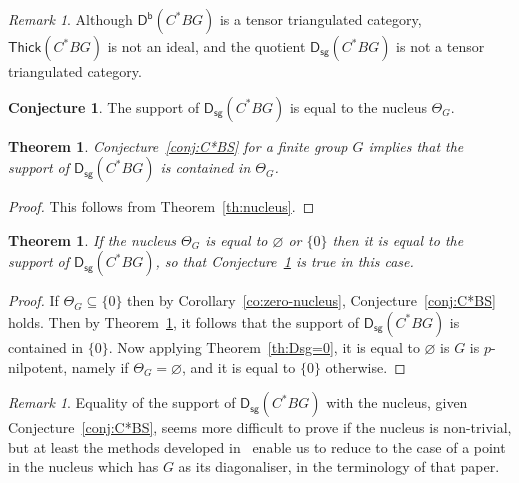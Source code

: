 \documentclass[12pt]{amsart}
\newcommand{\DD}{\mathsf{D}}%
\newcommand{\Db}{\DD^{\mathsf{b}}}%
\newcommand{\Dsg}{\DD_{\mathsf{sg}}}%
\newcommand{\Thick}{\mathsf{Thick}}
\numberwithin{equation}{section}
\theoremstyle{plain}
\newtheorem{theorem}[equation]{Theorem}
\theoremstyle{definition}
\newtheorem{conjecture}[equation]{Conjecture}
\theoremstyle{remark}
\newtheorem{remark}[equation]{Remark}
\begin{document}
\begin{remark}
  Although $\Db(C^*BG)$ is a tensor triangulated category,
  $\Thick(C^*BG)$ is not an ideal, and the quotient $\Dsg(C^*BG)$ is
  not a tensor triangulated category.
\end{remark}

\begin{conjecture}\label{conj:suppDsg}
  The support of $\Dsg(C^*BG)$ is equal to the nucleus $\Theta_G$.
\end{conjecture}

\begin{theorem}\label{th:C*BS=>suppDsg}
Conjecture~\ref{conj:C*BS} for a finite group $G$ implies that the support of $\Dsg(C^*BG)$
is contained in $\Theta_G$.
\end{theorem}
\begin{proof}
This follows from Theorem~\ref{th:nucleus}.
\end{proof}

\begin{theorem}\label{th:triv-nucleus}
If the nucleus $\Theta_G$ is equal to $\varnothing$ or $\{0\}$ then it
is equal to the support of $\Dsg(C^*BG)$, so that
Conjecture~\ref{conj:suppDsg} is true in this case.
\end{theorem}
\begin{proof}
If $\Theta_G\subseteq\{0\}$ then by Corollary~\ref{co:zero-nucleus},
Conjecture~\ref{conj:C*BS} holds. Then by
Theorem~\ref{th:C*BS=>suppDsg}, it follows that the support of
$\Dsg(C^*BG)$ is contained in $\{0\}$. Now applying
Theorem~\ref{th:Dsg=0}, it is equal to $\varnothing$ is $G$ is
$p$-nilpotent, namely if $\Theta_G=\varnothing$, and it is equal to
$\{0\}$ otherwise.
\end{proof}


  
\begin{remark}
  Equality of the support of $\Dsg(C^*BG)$ with the nucleus, given
  Conjecture~\ref{conj:C*BS}, seems more difficult to prove if the
  nucleus is non-trivial, but at
  least the methods developed in~\cite{Benson:1995a} enable us to
  reduce to the case of a point in the nucleus which has $G$ as its
  diagonaliser, in the terminology of that paper.
\end{remark}



\end{document}

